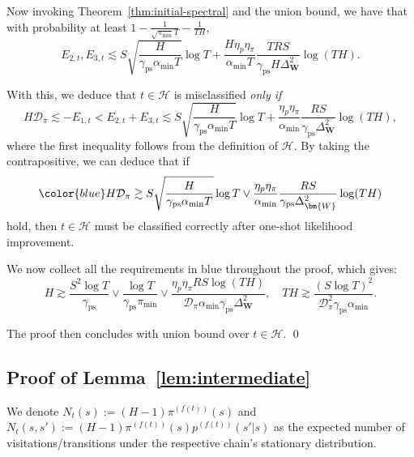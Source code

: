 \documentclass[twoside]{article}
\def\mW{{\bm{W}}}
\def\gD{{\mathcal{D}}}
\def\gH{{\mathcal{H}}}
\theoremstyle{plain}
\newcommand{\ps}{\mathrm{ps}}
\begin{document}
Now invoking Theorem~\ref{thm:initial-spectral} and the union bound, we have that with probability at least $1 - \frac{1}{\sqrt{\pi_{\min}} T} - \frac{1}{T H}$,
\begin{equation}
    E_{2,t}, E_{3,t} \lesssim S \sqrt{\frac{H}{\gamma_\ps \alpha_{\min} T}} \log T + \frac{H \eta_p \eta_\pi}{\alpha_{\min} T} \frac{T R S}{\gamma_\ps H \Delta_\mW^2} \log(TH).
\end{equation}


With this, we deduce that $t \in \gH$ is misclassified \textit{only if}
\begin{equation*}
    H \gD_\pi \lesssim -E_{1,t} < E_{2,t} + E_{3,t} \lesssim S \sqrt{\frac{H}{\gamma_\ps \alpha_{\min} T}} \log T + \frac{\eta_p \eta_\pi}{\alpha_{\min}} \frac{R S}{\gamma_\ps \Delta_\mW^2} \log(TH),
\end{equation*}
where the first inequality follows from the definition of $\gH$.
By taking the contrapositive, we can deduce that if
\begin{equation*}
    \color{blue}
    H \gD_\pi \gtrsim S \sqrt{\frac{H}{\gamma_\ps \alpha_{\min} T}} \log T \vee \frac{\eta_p \eta_\pi}{\alpha_{\min}} \frac{R S}{\gamma_\ps \Delta_\mW^2} \log(TH)
\end{equation*}
hold, then $t \in \gH$ must be classified correctly after one-shot likelihood improvement.

We now collect all the requirements in {\color{blue} blue} throughout the proof, which gives:
\begin{equation}
    H \gtrsim \frac{S^2 \log T}{\gamma_\ps} \vee \frac{\log T}{\gamma_\ps \pi_{\min}} \vee \frac{\eta_p \eta_\pi R S \log (TH)}{\gD_\pi \alpha_{\min} \gamma_\ps \Delta_\mW^2}, \quad TH \gtrsim \frac{(S \log T)^2}{\gD_\pi^2 \gamma_\ps \alpha_{\min}}.
\end{equation}

The proof then concludes with union bound over $t \in \gH$. 
\qed





\subsection{Proof of Lemma~\ref{lem:intermediate}}
We denote $N_t(s) := (H - 1) \pi^{(f(t))}(s)$ and $N_t(s, s') := (H - 1) \pi^{(f(t))}(s) p^{(f(t))}(s' | s)$ as the expected number of visitations/transitions under the respective chain's stationary distribution.
\end{document}
